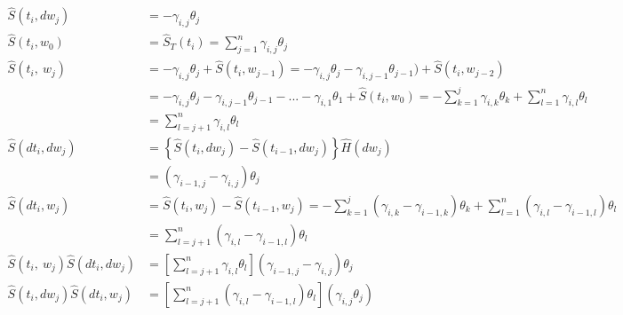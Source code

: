 \documentclass[]{article}\usepackage[]{graphicx}\usepackage[]{color}
\begin{document}
\begin{align*}
  \widehat{S} (t_i, dw_j) &= -\gamma_{i,j} \theta_j  \\
  \widehat{S} (t_i, w_0) &= \widehat{S}_{T}(t_i) = \sum_{j=1}^n \gamma_{i,j} \theta_j\\
  \widehat{S} (t_i, ~w_j) &= -\gamma_{i,j} \theta_j  + \widehat{S} (t_i, w_{j-1}) =  -\gamma_{i,j}\theta_j -\gamma_{i,j-1}\theta_{j-1})  + \widehat{S} (t_i, w_{j-2}) \\
  &= -\gamma_{i,j}\theta_j -\gamma_{i,j-1}\theta_{j-1} - ... - \gamma_{i,1}\theta_{1}  + \widehat{S} (t_i, w_0) = -\sum_{k=1}^j \gamma_{i,k} \theta_k  + \sum_{l=1}^n \gamma_{i,l} \theta_l\\
  & = \sum_{l=j+1}^n \gamma_{i,l} \theta_l\\
   \widehat{S} (dt_i, dw_j) &= \left\{    \widehat{S} (t_i, dw_j) - \widehat{S} (t_{i-1}, dw_j)  \right\} \widehat{H}(dw_j)\\
   &= \left(    \gamma_{i-1,j} - \gamma_{i,j}   \right) \theta_j\\
   \widehat{S} (dt_i, w_j) &= \widehat{S} (t_i, w_j) - \widehat{S} (t_{i-1}, w_j)=
    -\sum_{k=1}^j( \gamma_{i,k} - \gamma_{i-1,k} )\theta_k  + \sum_{l=1}^n (\gamma_{i,l} - \gamma_{i-1,l}) \theta_l\\
   & = \sum_{l=j+1}^n \left(  \gamma_{i,l} - \gamma_{i-1,l} \right) \theta_l \\
  \widehat{S} (t_i, ~w_j) \widehat{S} (dt_i, dw_j) &=   \left[  \sum_{l=j+1}^n \gamma_{i,l} \theta_l \right]  \left(    \gamma_{i-1,j} - \gamma_{i,j}   \right) \theta_j  \\
  \widehat{S} (t_i, dw_j) \widehat{S} (dt_i, w_j) &=  \left[   \sum_{l=j+1}^n\left( \gamma_{i,l} - \gamma_{i-1,l}   \right) \theta_l \right]  (\gamma_{i,j} \theta_j) \\

\end{align*}
\end{document}
